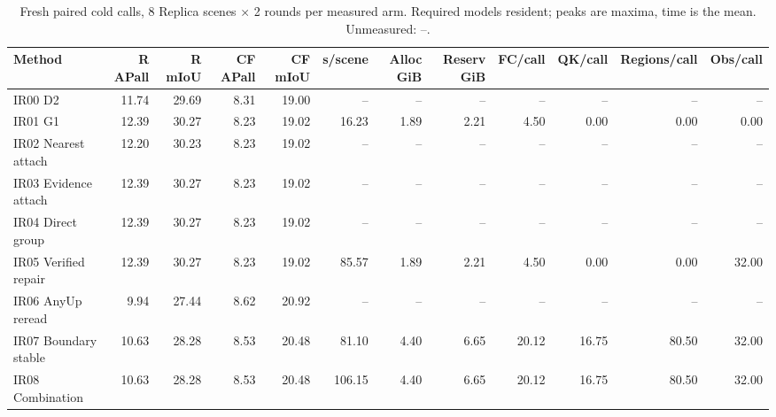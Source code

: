 \begin{table}[t]
\centering
\small
\begin{tabular}{lrrrrrrrrrrr}
\toprule
Method & R APall & R mIoU & CF APall & CF mIoU & s/scene & Alloc GiB & Reserv GiB & FC/call & QK/call & Regions/call & Obs/call \\
\midrule
IR00 D2 & 11.74 & 29.69 & 8.31 & 19.00 & -- & -- & -- & -- & -- & -- & -- \\
IR01 G1 & 12.39 & 30.27 & 8.23 & 19.02 & 16.23 & 1.89 & 2.21 & 4.50 & 0.00 & 0.00 & 0.00 \\
IR02 Nearest attach & 12.20 & 30.23 & 8.23 & 19.02 & -- & -- & -- & -- & -- & -- & -- \\
IR03 Evidence attach & 12.39 & 30.27 & 8.23 & 19.02 & -- & -- & -- & -- & -- & -- & -- \\
IR04 Direct group & 12.39 & 30.27 & 8.23 & 19.02 & -- & -- & -- & -- & -- & -- & -- \\
IR05 Verified repair & 12.39 & 30.27 & 8.23 & 19.02 & 85.57 & 1.89 & 2.21 & 4.50 & 0.00 & 0.00 & 32.00 \\
IR06 AnyUp reread & 9.94 & 27.44 & 8.62 & 20.92 & -- & -- & -- & -- & -- & -- & -- \\
IR07 Boundary stable & 10.63 & 28.28 & 8.53 & 20.48 & 81.10 & 4.40 & 6.65 & 20.12 & 16.75 & 80.50 & 32.00 \\
IR08 Combination & 10.63 & 28.28 & 8.53 & 20.48 & 106.15 & 4.40 & 6.65 & 20.12 & 16.75 & 80.50 & 32.00 \\
\bottomrule
\end{tabular}
\caption{Fresh paired cold calls, 8 Replica scenes × 2 rounds per measured arm. Required models resident; peaks are maxima, time is the mean. Unmeasured: --.}
\label{tab:minimal-repair-3}
\end{table}

